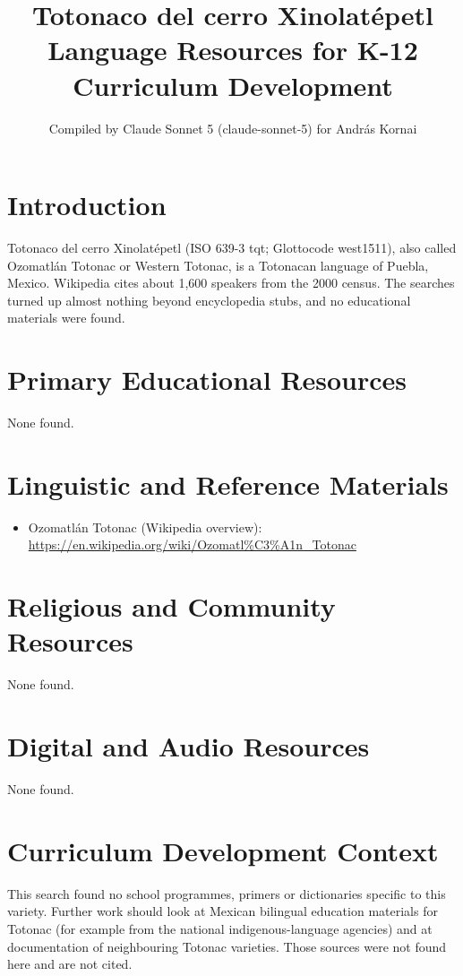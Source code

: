 \documentclass[12pt]{article}
\title{Totonaco del cerro Xinolat\'epetl Language Resources for K-12 Curriculum Development}
\author{Compiled by Claude Sonnet 5 (claude-sonnet-5) for Andr\'as Kornai}
\date{}
\begin{document}
\maketitle

\section{Introduction}
Totonaco del cerro Xinolat\'epetl (ISO 639-3 tqt; Glottocode west1511), also called Ozomatl\'an Totonac or Western Totonac, is a Totonacan language of Puebla, Mexico. Wikipedia cites about 1,600 speakers from the 2000 census. The searches turned up almost nothing beyond encyclopedia stubs, and no educational materials were found.

\section{Primary Educational Resources}
None found.

\section{Linguistic and Reference Materials}
\begin{itemize}
\item Ozomatl\'an Totonac (Wikipedia overview): \url{https://en.wikipedia.org/wiki/Ozomatl%C3%A1n_Totonac}
\end{itemize}

\section{Religious and Community Resources}
None found.

\section{Digital and Audio Resources}
None found.

\section{Curriculum Development Context}
This search found no school programmes, primers or dictionaries specific to this variety. Further work should look at Mexican bilingual education materials for Totonac (for example from the national indigenous-language agencies) and at documentation of neighbouring Totonac varieties. Those sources were not found here and are not cited.
\end{document}
